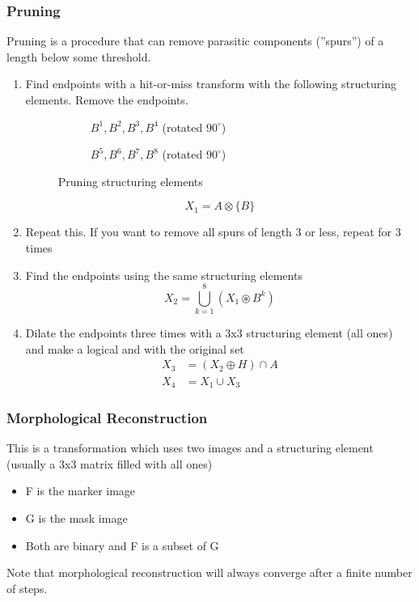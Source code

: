 \subsubsection{Pruning}
Pruning is a procedure that can remove parasitic components (''spurs'') of a length below some threshold.\\
\begin{enumerate}
\item Find endpoints with a hit-or-miss transform with the following structuring elements. Remove the endpoints.
\begin{figure}[h!]
\centering
\begin{subfigure}[b]{0.45\textwidth}
\centering
{}
\caption{$B^1, B^2, B^3, B^4$ (rotated $90^\circ$)}
\end{subfigure}
\begin{subfigure}[b]{0.45\textwidth}
\centering
{}
\caption{$B^5, B^6, B^7, B^8$ (rotated $90^\circ$)}
\end{subfigure}
\caption{Pruning structuring elements}
\end{figure}
  \[
    X_1 = A \otimes \{B\}
  \]
\item Repeat this. If you want to remove all spurs of length 3 or less, repeat for 3 times
\item Find the endpoints using the same structuring elements
  \[
    X_2 = \bigcup_{k=1}^{8}(X_1 \circledast B^{k})
  \]
\item Dilate the endpoints three times with a 3x3 structuring element (all ones) and make a logical and with the original set
\begin{align*}
  X_3 &= (X_2 \oplus H) \cap A \\
  X_4 &= X_1 \cup X_3
\end{align*}
\end{enumerate}

\subsubsection{Morphological Reconstruction}
This is a transformation which uses two images and a structuring element (usually a 3x3 matrix filled with all ones)
\begin{itemize}
\item F is the marker image
\item G is the mask image
\item Both are binary and F is a subset of G
\end{itemize}
Note that morphological reconstruction will always converge after a finite number of steps.

